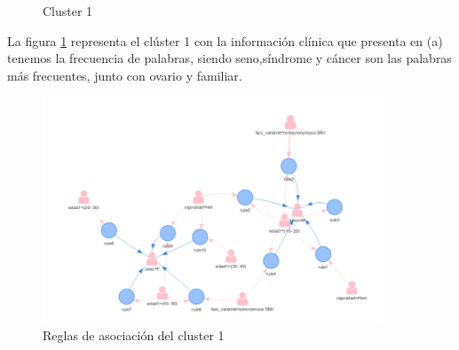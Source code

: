 \begin{figure}[H]
	\centering
	\caption{Cluster 1} \label{fig:c1}
\end{figure}

La figura \ref{fig:c1} representa el clúster 1 con la información clínica que presenta en (a) tenemos la frecuencia de palabras, siendo seno,síndrome y cáncer son las palabras más frecuentes, junto con ovario y familiar.

\begin{figure}[H]
	\centering
	\includegraphics[width=0.9\textwidth]{Kap4/reglasc1}
	\caption{Reglas de asociación del cluster 1} \label{fig:reglas}
\end{figure}


